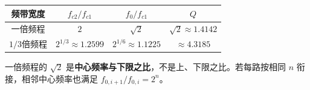 \begin{table}[H]
\centering\small
\begin{tabular}{@{}c c c c@{}}
\toprule
频带宽度 & $f_{c2}/f_{c1}$ & $f_0/f_{c1}$ & $Q$ \\
\midrule
一倍频程 & $2$ & $\sqrt2$ & $\sqrt2\approx1.4142$ \\
$1/3$倍频程 & $2^{1/3}\approx1.2599$ & $2^{1/6}\approx1.1225$ & $\approx4.3185$ \\
\bottomrule
\end{tabular}
\end{table}
一倍频程的 $\sqrt2$ 是\textbf{中心频率与下限之比}，不是上、下限之比。若每路按相同 $n$ 衔接，相邻中心频率也满足 $f_{0,i+1}/f_{0,i}=2^n$。
